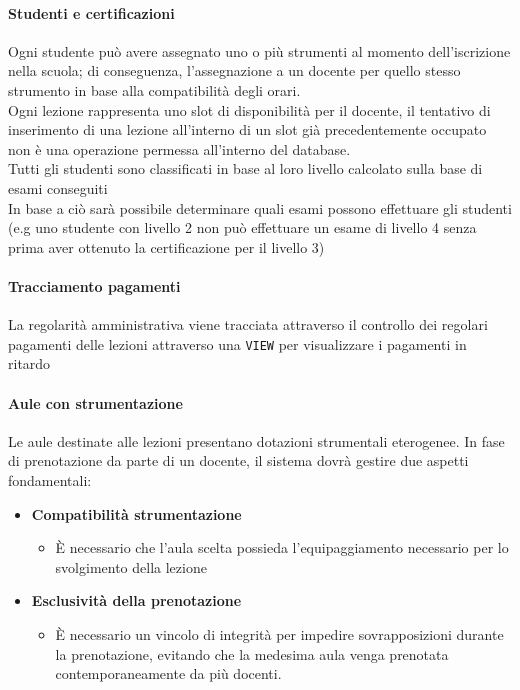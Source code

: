 \paragraph{Studenti e certificazioni}
Ogni studente può avere assegnato uno o più strumenti al momento dell'iscrizione nella scuola; di conseguenza, l'assegnazione a un docente per quello stesso strumento in base alla compatibilità degli orari. 
\\
Ogni lezione rappresenta uno slot di disponibilità per il docente, il tentativo di inserimento di una lezione all'interno di un slot già precedentemente occupato non è una operazione permessa all'interno del database. 
\\ 
Tutti gli studenti sono classificati in base al loro livello calcolato sulla base di esami conseguiti
\\
In base a ciò sarà possibile determinare quali esami possono effettuare gli studenti (e.g uno studente con livello 2 non può effettuare un esame di livello 4 senza prima aver ottenuto la certificazione per il livello 3) 
\paragraph{Tracciamento pagamenti}
La regolarità amministrativa viene tracciata attraverso il controllo dei regolari pagamenti delle lezioni attraverso una \texttt{VIEW} per visualizzare i pagamenti in ritardo
\newpage
\paragraph{Aule con strumentazione}
Le aule destinate alle lezioni presentano dotazioni strumentali eterogenee. In fase di prenotazione da parte di un docente, il sistema dovrà gestire due aspetti fondamentali:
\begin{itemize}
    \item \textbf{Compatibilità strumentazione}
    \begin{itemize}
        \item È necessario che l'aula scelta possieda l'equipaggiamento necessario per lo svolgimento della lezione
    \end{itemize}
    \item \textbf{Esclusività della prenotazione} 
    \begin{itemize}
        \item È necessario un vincolo di integrità per impedire sovrapposizioni durante la prenotazione, evitando che la medesima aula venga prenotata contemporaneamente da più docenti.
    \end{itemize}
\end{itemize}
